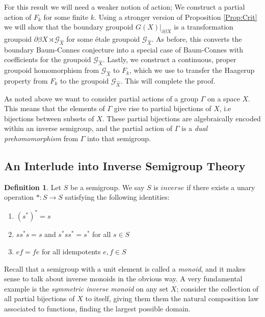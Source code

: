 \documentclass[11pt]{amsart}
\theoremstyle{plain}
\theoremstyle{definition}%
\newtheorem{definition}[theorem]{Definition}%
\theoremstyle{remark}%
\newcommand{\G}{\mathcal{G}}
\begin{document}
For this result we will need a weaker notion of action; We construct a partial action \cite{} of $F_{k}$ for some finite $k$. Using a stronger version of Proposition \ref{Prop:Crit} we will show that the boundary groupoid $G(X)|_{\partial\beta X}$ is a transformation groupoid $\partial\beta X \rtimes \G_{\widehat{X}}$ for some \'etale groupoid $\G_{\widehat{X}}$. As before, this converts the boundary Baum-Connes conjecture into a special case of Baum-Connes with coefficients for the groupoid $\G_{\widehat{X}}$. Lastly, we construct a continuous, proper groupoid homomorphism from $\G_{\widehat{X}}$ to $F_{k}$, which we use to transfer the Haagerup property from $F_{k}$ to the groupoid $\G_{\widehat{X}}$. This will complete the proof.

As noted above we want to consider partial actions of a group $\Gamma$ on a space $X$. This means that the elements of $\Gamma$ give rise to partial bijections of $X$, i.e bijections between subsets of $X$. These partial bijections are algebraically encoded within an inverse semigroup, and the partial action of $\Gamma$ is a \textit{dual prehomomorphism} from $\Gamma$ into that semigroup.

\subsection{An Interlude into Inverse Semigroup Theory}\label{Sect:SemiToGpoid}
                                                                               
\begin{definition}\label{Def:invsemi}
Let $S$ be a semigroup. We say $S$ is $inverse$ if there exists a unary operation $*:S \rightarrow S$ satisfying the following identities:
\begin{enumerate}
\item $(s^{*})^{*}=s$
\item $ss^{*}s=s$ and $s^{*}ss^{*}=s^{*}$ for all $s \in S$
\item $ef=fe$ for all idempotents $e,f \in S$ 
\end{enumerate}
\end{definition}

Recall that a semigroup with a unit element is called a \textit{monoid}, and it makes sense to talk about inverse monoids in the obvious way. A very fundamental example is the \textit{symmetric inverse monoid} on any set $X$; consider the collection of all partial bijections of $X$ to itself, giving them them the natural composition law associated to functions, finding the largest possible domain.
\end{document}
